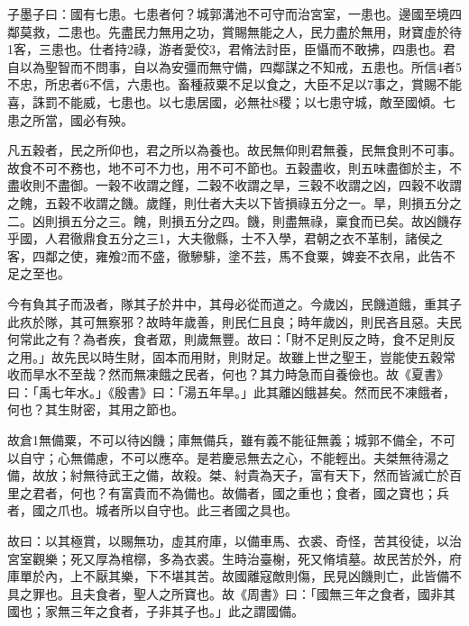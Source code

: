 
\begin{pinyinscope}
子墨子曰：國有七患。七患者何？城郭溝池不可守而治宮室，一患也。邊國至境四鄰莫救，二患也。先盡民力無用之功，賞賜無能之人，民力盡於無用，財寶虛於待1客，三患也。仕者持2祿，游者愛佼3，君脩法討臣，臣懾而不敢拂，四患也。君自以為聖智而不問事，自以為安彊而無守備，四鄰謀之不知戒，五患也。所信4者5不忠，所忠者6不信，六患也。畜種菽粟不足以食之，大臣不足以7事之，賞賜不能喜，誅罰不能威，七患也。以七患居國，必無社8稷；以七患守城，敵至國傾。七患之所當，國必有殃。

凡五穀者，民之所仰也，君之所以為養也。故民無仰則君無養，民無食則不可事。故食不可不務也，地不可不力也，用不可不節也。五穀盡收，則五味盡御於主，不盡收則不盡御。一穀不收謂之饉，二穀不收謂之旱，三穀不收謂之凶，四穀不收謂之餽，五穀不收謂之饑。歲饉，則仕者大夫以下皆損祿五分之一。旱，則損五分之二。凶則損五分之三。餽，則損五分之四。饑，則盡無祿，稟食而已矣。故凶饑存乎國，人君徹鼎食五分之三1，大夫徹縣，士不入學，君朝之衣不革制，諸侯之客，四鄰之使，雍飧2而不盛，徹驂騑，塗不芸，馬不食粟，婢妾不衣帛，此告不足之至也。

今有負其子而汲者，隊其子於井中，其母必從而道之。今歲凶，民饑道餓，重其子此疚於隊，其可無察邪？故時年歲善，則民仁且良；時年歲凶，則民吝且惡。夫民何常此之有？為者疾，食者眾，則歲無豐。故曰：「財不足則反之時，食不足則反之用。」故先民以時生財，固本而用財，則財足。故雖上世之聖王，豈能使五穀常收而旱水不至哉？然而無凍餓之民者，何也？其力時急而自養儉也。故《夏書》曰：「禹七年水。」《殷書》曰：「湯五年旱。」此其離凶餓甚矣。然而民不凍餓者，何也？其生財密，其用之節也。

故倉1無備粟，不可以待凶饑；庫無備兵，雖有義不能征無義；城郭不備全，不可以自守；心無備慮，不可以應卒。是若慶忌無去之心，不能輕出。夫桀無待湯之備，故放；紂無待武王之備，故殺。桀、紂貴為天子，富有天下，然而皆滅亡於百里之君者，何也？有富貴而不為備也。故備者，國之重也；食者，國之寶也；兵者，國之爪也。城者所以自守也。此三者國之具也。

故曰：以其極賞，以賜無功，虛其府庫，以備車馬、衣裘、奇怪，苦其役徒，以治宮室觀樂；死又厚為棺槨，多為衣裘。生時治臺榭，死又脩墳墓。故民苦於外，府庫單於內，上不厭其樂，下不堪其苦。故國離寇敵則傷，民見凶饑則亡，此皆備不具之罪也。且夫食者，聖人之所寶也。故《周書》曰：「國無三年之食者，國非其國也；家無三年之食者，子非其子也。」此之謂國備。


\end{pinyinscope}